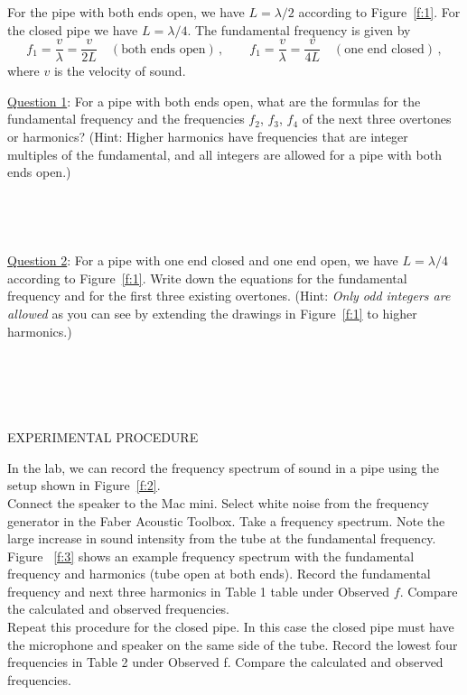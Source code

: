 \documentclass[11pt]{NSF}
\def\be{\begin{equation}}
\def\ee{\end{equation}}
\begin{document}
For the pipe with both ends open, we have $L = \lambda/2$ according to 
Figure~\ref{f:1}. 
For the closed pipe we have $L = \lambda/4$. 
The fundamental frequency is given by
%
\be
f_1 = \frac{v}{\lambda} = \frac{v}{2L}
\quad(\text{both ends open})\,,
\qquad
f_1 = \frac{v}{\lambda} = \frac{v}{4L} 
\quad(\text{one end closed})\,,
\ee
%
where $v$ is the velocity of sound.


\underline{Question 1}:  For a pipe with both ends open, what are the formulas for the fundamental
frequency and the frequencies $f_2$, $f_3$, $f_4$ of the next three overtones or harmonics?
(Hint: Higher harmonics have frequencies that are integer multiples of the
fundamental, and all integers are allowed for a pipe with both ends open.)
\\
\\
\\
\\
\\

\underline{Question 2}: 
For a pipe with one end closed and one end open, we have $L = \lambda/4$ 
according to Figure~\ref{f:1}. 
Write down the equations for the fundamental frequency and for the
first three existing overtones. 
(Hint: {\em Only odd integers are allowed} as you can see by extending 
the drawings in Figure~\ref{f:1} to higher harmonics.) \\
\\
\\
\\
\\
\\

EXPERIMENTAL PROCEDURE

In the lab, we can record the frequency spectrum of sound in a pipe
using the setup shown in Figure~\ref{f:2}. \\

Connect the speaker to the Mac mini. Select white noise from the frequency generator
in the Faber Acoustic Toolbox. Take a frequency spectrum. Note the large increase in sound intensity from the tube at the fundamental frequency. Figure ~\ref{f:3} shows an example frequency spectrum with the fundamental frequency and harmonics
(tube open at both ends). Record the fundamental frequency and next three harmonics in Table 1
table under Observed $f$. Compare the calculated and observed frequencies. \\

Repeat this procedure for the closed pipe. In this case the closed pipe must have the microphone
and speaker on the same side of the tube. Record the lowest four frequencies in Table 2 under
Observed f. Compare the calculated and observed frequencies.
\end{document}
